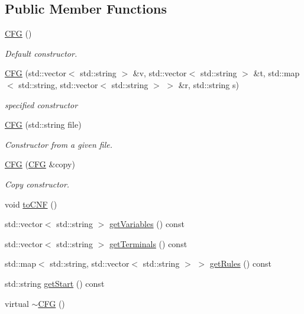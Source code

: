 \subsection*{\-Public \-Member \-Functions}
\begin{DoxyCompactItemize}
\item 
\hyperlink{classCFG_a6a6d74b60d6abc9b91031aaac23067ff}{\-C\-F\-G} ()
\begin{DoxyCompactList}\small\item\em \-Default constructor. \end{DoxyCompactList}\item 
\hyperlink{classCFG_ae6f918a908ebef14199ce1e6ce909196}{\-C\-F\-G} (std\-::vector$<$ std\-::string $>$ \&v, std\-::vector$<$ std\-::string $>$ \&t, std\-::map$<$ std\-::string, std\-::vector$<$ std\-::string $>$ $>$ \&r, std\-::string s)
\begin{DoxyCompactList}\small\item\em specified constructor \end{DoxyCompactList}\item 
\hyperlink{classCFG_a5a7524ec649377e2d8c2d8218db40b44}{\-C\-F\-G} (std\-::string file)
\begin{DoxyCompactList}\small\item\em \-Constructor from a given file. \end{DoxyCompactList}\item 
\hyperlink{classCFG_acdf5e087e7726343079e006f6dd0d43e}{\-C\-F\-G} (\hyperlink{classCFG}{\-C\-F\-G} \&copy)
\begin{DoxyCompactList}\small\item\em \-Copy constructor. \end{DoxyCompactList}\item 
void \hyperlink{classCFG_a4f0a00a699ba4a6247333a47b0bf9ff2}{to\-C\-N\-F} ()
\item 
std\-::vector$<$ std\-::string $>$ \hyperlink{classCFG_abe3e4a8324808575d5d0c033671b71ab}{get\-Variables} () const 
\item 
std\-::vector$<$ std\-::string $>$ \hyperlink{classCFG_a766b9baac4bd283b8b761139e75aae55}{get\-Terminals} () const 
\item 
std\-::map$<$ std\-::string, \*
std\-::vector$<$ std\-::string $>$ $>$ \hyperlink{classCFG_aa861ae80a1391594cf2bf50cfac38ea9}{get\-Rules} () const 
\item 
std\-::string \hyperlink{classCFG_ae7e150fabee50d533159038262bc71d3}{get\-Start} () const 
\item 
virtual \hyperlink{classCFG_aaf69bdb0d01010bf6272a097ccc0c60c}{$\sim$\-C\-F\-G} ()
\end{DoxyCompactItemize}
